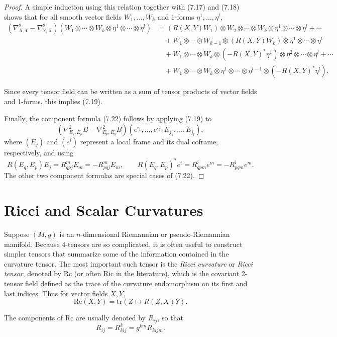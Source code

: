 \begin{proof}
A simple induction using this relation together with (7.17) and (7.18) shows that for all smooth vector fields $W_1, \ldots, W_k$ and 1-forms $\eta^1, \ldots, \eta^l$,
\begin{align*}
(\nabla^2_{X,Y} - \nabla^2_{Y,X})(W_1 \otimes \cdots \otimes W_k \otimes \eta^1 \otimes \cdots \otimes \eta^l)
&= (R(X,Y)W_1) \otimes W_2 \otimes \cdots \otimes W_k \otimes \eta^1 \otimes \cdots \otimes \eta^l + \cdots\\
&\quad + W_1 \otimes \cdots \otimes W_{k-1} \otimes (R(X,Y)W_k) \otimes \eta^1 \otimes \cdots \otimes \eta^l\\
&\quad + W_1 \otimes \cdots \otimes W_k \otimes (-R(X,Y)^* \eta^1) \otimes \eta^2 \otimes \cdots \otimes \eta^l + \cdots\\
&\quad + W_1 \otimes \cdots \otimes W_k \otimes \eta^1 \otimes \cdots \otimes \eta^{l-1} \otimes (-R(X,Y)^* \eta^l).
\end{align*}

Since every tensor field can be written as a sum of tensor products of vector fields and 1-forms, this implies (7.19).

Finally, the component formula (7.22) follows by applying (7.19) to
\[
(\nabla^2_{E_q, E_p} B - \nabla^2_{E_p, E_q} B)(e^{i_1}, \ldots, e^{i_k}, E_{j_1}, \ldots, E_{j_l}),
\]
where $(E_j)$ and $(e^i)$ represent a local frame and its dual coframe, respectively, and using
\[
R(E_q, E_p) E_j = R_{qpj}^m E_m = -R_{pqj}^m E_m,
\qquad R(E_q, E_p)^* e^i = R_{qpm}^i e^m = -R_{pqm}^i e^m.
\]
The other two component formulas are special cases of (7.22).
\end{proof}

\section{Ricci and Scalar Curvatures}

Suppose $(M, g)$ is an $n$-dimensional Riemannian or pseudo-Riemannian manifold. Because 4-tensors are so complicated, it is often useful to construct simpler tensors that summarize some of the information contained in the curvature tensor. The most important such tensor is the \textit{Ricci curvature} or \textit{Ricci tensor}, denoted by $\mathrm{Rc}$ (or often $\mathrm{Ric}$ in the literature), which is the covariant 2-tensor field defined as the trace of the curvature endomorphism on its first and last indices. Thus for vector fields $X, Y$,
\[
\mathrm{Rc}(X,Y) = \mathrm{tr}(Z \mapsto R(Z,X)Y).
\]

The components of $\text{Rc}$ are usually denoted by $R_{ij}$, so that
\[
R_{ij} = R_{kij}^k = g^{km} R_{kijm}.
\]

